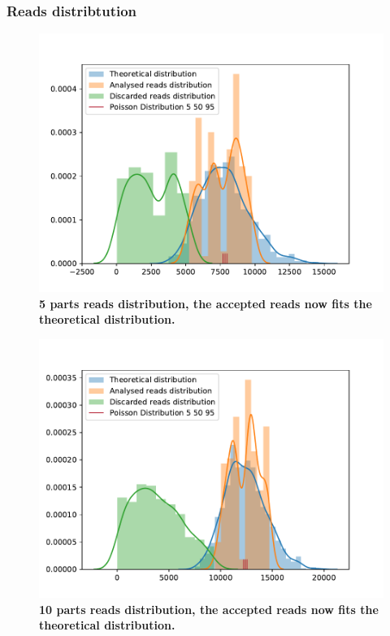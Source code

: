 \documentclass[11pt, a4paper]{article}
\begin{document}
\subsubsection{Reads distribtution }
 \begin{figure}[ht]
      \begin{center}
      \includegraphics[width=1\textwidth]{../results/images_notebook/v_310/5_parts_distribution.pdf}
      \end{center}
      \caption{{\bf 5 parts reads distribution, the accepted reads now fits the theoretical distribution. }}
     \label{fig:v_310_reads_5_parts}
 \end{figure}
 
 \begin{figure}[ht]
    \begin{center}
    \includegraphics[width=1\textwidth]{../results/images_notebook/v_310/10_parts_distribution.pdf}
    \end{center}
    \caption{{\bf 10 parts reads distribution, the accepted reads now fits the theoretical distribution. }}
   \label{fig:v_310_reads_10_parts}
\end{figure}
\end{document}
